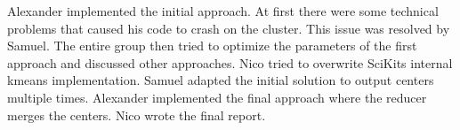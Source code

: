 \documentclass[a4paper, 11pt]{article}
\begin{document}
Alexander implemented the initial approach. At first there were some technical problems that caused his code to crash on the cluster. This issue was
resolved by Samuel. The entire group then tried to optimize the parameters of the first approach and discussed other approaches. Nico tried to overwrite 
SciKits internal kmeans implementation. Samuel adapted the initial solution to output centers multiple times. 
Alexander implemented the final approach where the reducer merges the centers. Nico wrote the final report.



\end{document}
